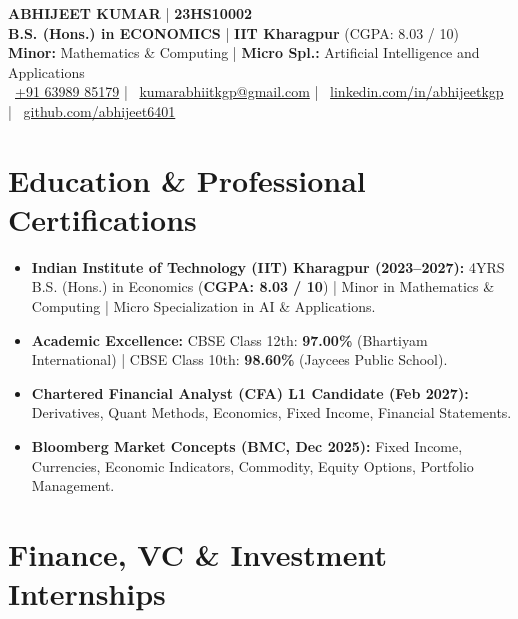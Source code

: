 \documentclass[10pt, a4paper]{article}
\begin{document}
\begin{center}
  {\LARGE \textbf{ABHIJEET KUMAR}} \quad | \quad \textbf{23HS10002} \\[3pt]
  \textbf{B.S. (Hons.) in ECONOMICS} \quad | \quad \textbf{IIT Kharagpur} (CGPA: 8.03 / 10) \\[2pt]
  \small \textbf{Minor:} Mathematics \& Computing \quad | \quad \textbf{Micro Spl.:} Artificial Intelligence and Applications \\[3pt]
  \small
  \faPhone\ \href{tel:+916398985179}{+91 63989 85179} \quad | \quad
  \faEnvelope\ \href{mailto:kumarabhiitkgp@gmail.com}{kumarabhiitkgp@gmail.com} \quad | \quad
  \faLinkedin\ \href{https://linkedin.com/in/abhijeetkgp}{linkedin.com/in/abhijeetkgp} \quad | \quad
  \faGithub\ \href{https://github.com/abhijeet6401}{github.com/abhijeet6401}
\end{center}

\vspace{-4pt}

\section{Education \& Professional Certifications}
\begin{itemize}[leftmargin=1.2em, itemsep=0.5pt, parsep=0pt, topsep=1pt]
  \small
  \item \textbf{Indian Institute of Technology (IIT) Kharagpur (2023--2027):} 4YRS B.S. (Hons.) in Economics (\textbf{CGPA: 8.03 / 10}) | Minor in Mathematics \& Computing | Micro Specialization in AI \& Applications.
  \item \textbf{Academic Excellence:} CBSE Class 12th: \textbf{97.00\%} (Bhartiyam International) | CBSE Class 10th: \textbf{98.60\%} (Jaycees Public School).
  \item \textbf{Chartered Financial Analyst (CFA) L1 Candidate (Feb 2027):} Derivatives, Quant Methods, Economics, Fixed Income, Financial Statements.
  \item \textbf{Bloomberg Market Concepts (BMC, Dec 2025):} Fixed Income, Currencies, Economic Indicators, Commodity, Equity Options, Portfolio Management.
\end{itemize}

\vspace{-2pt}

\section{Finance, VC \& Investment Internships}
\end{document}
